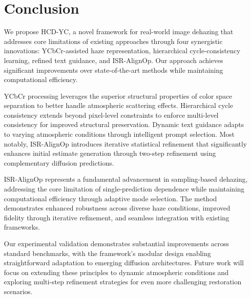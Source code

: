 \documentclass{article}
\begin{document}
\section{Conclusion}

We propose HCD-YC, a novel framework for real-world image dehazing that addresses core limitations of existing approaches through four synergistic innovations: YCbCr-assisted haze representation, hierarchical cycle-consistency learning, refined text guidance, and ISR-AlignOp. Our approach achieves significant improvements over state-of-the-art methods while maintaining computational efficiency.

YCbCr processing leverages the superior structural properties of color space separation to better handle atmospheric scattering effects. Hierarchical cycle consistency extends beyond pixel-level constraints to enforce multi-level consistency for improved structural preservation. Dynamic text guidance adapts to varying atmospheric conditions through intelligent prompt selection. Most notably, ISR-AlignOp introduces iterative statistical refinement that significantly enhances initial estimate generation through two-step refinement using complementary diffusion predictions.

ISR-AlignOp represents a fundamental advancement in sampling-based dehazing, addressing the core limitation of single-prediction dependence while maintaining computational efficiency through adaptive mode selection. The method demonstrates enhanced robustness across diverse haze conditions, improved fidelity through iterative refinement, and seamless integration with existing frameworks.

Our experimental validation demonstrates substantial improvements across standard benchmarks, with the framework's modular design enabling straightforward adaptation to emerging diffusion architectures. Future work will focus on extending these principles to dynamic atmospheric conditions and exploring multi-step refinement strategies for even more challenging restoration scenarios.



\end{document}
